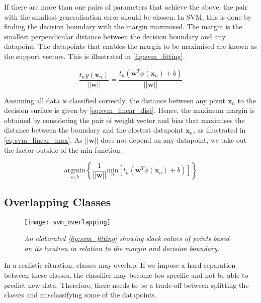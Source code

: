 \documentclass[dissertation.tex]{subfiles}
\begin{document}
If there are more than one pairs of parameters that achieve the above, the pair with the smallest generalisation error should be chosen. In SVM, this is done by finding the decision boundary with the margin maximised. The margin is the smallest perpendicular distance between the decision boundary and any datapoint. The datapoints that enables the margin to be maximised are known as the support vectors. This is illustrated in \autoref{fig:svm_fitting}.

\begin{equation} \label{eq:svm_linear_dist}
  \frac{t_n y(\mathbf{x}_n)}{||\mathbf{w}||} = \frac{t_n (\mathbf{w}^T \phi(\mathbf{x}_n) + b)}{||\mathbf{w}||}
\end{equation}

Assuming all data is classified correctly, the distance between any point $\mathbf{x}_n$ to the decision surface is given by \autoref{eq:svm_linear_dist}. Hence, the maximum margin is obtained by considering the pair of weight vector and bias that maximises the distance between the boundary and the clostest datapoint $\mathbf{x}_n$, as illustrated in \autoref{eq:svm_linear_max}. As $||\mathbf{w}||$ does not depend on any datapoint, we take out the factor outside of the $\mathrm{min}$ function. 

\begin{equation} \label{eq:svm_linear_max}
  \underset{w,b}{\mathrm{argmin}} \left \{ \frac{1}{||\mathbf{w}||} \underset{n}{\mathrm{min}} \left [ t_n \left (\mathbf{w}^T \phi \left (\mathbf{x}_n \right) + b \right) \right ] \right \} 
\end{equation}

\subsection{Overlapping Classes}

\begin{figure}[h]
  \centering
  \texttt{[image: svm\_overlapping]}
  \caption{\textit{An elaborated \autoref{fig:svm_fitting} showing slack values of points based on its location in relation to the margin and decision boundary.}}
  \label{fig:svm_overlapping}
\end{figure}
In a realistic situation, classes may overlap. If we impose a hard separation between these classes, the classifier may become too specific and not be able to predict new data. Therefore, there needs to be a trade-off between splitting the classes and misclassifying some of the datapoints. 
\end{document}
